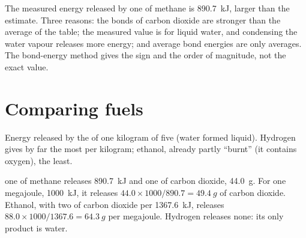 \begin{remark}\label{rem:g11:reaction-energy:compare}
The measured energy released by  one  of methane is
\qty{890.7}{kJ}, larger than the estimate. Three reasons: the 
bonds of carbon dioxide are stronger than the average  of the
table; the measured value is for liquid water, and condensing the water
vapour releases more energy; and average bond energies are only
averages. The bond-energy method gives the sign and the order of
magnitude, not the exact value.
\end{remark}

\section{Comparing fuels}

\begin{omfigure}

{\small Energy released by the  of one kilogram of
five  (water formed liquid). Hydrogen gives by far the most per
kilogram; ethanol, already partly ``burnt'' (it contains oxygen), the
least.}
\end{omfigure}

\begin{example}\label{ex:g11:reaction-energy:co2}
 one  of methane releases \qty{890.7}{kJ} and one  of
carbon dioxide, \qty{44.0}{g}. For one megajoule, \qty{1000}{kJ}, it
releases $44.0 \times 1000 / 890.7 = \qty{49.4}{g}$ of carbon dioxide.
Ethanol, with two  of carbon dioxide per \qty{1367.6}{kJ}, releases
$88.0 \times 1000 / 1367.6 = \qty{64.3}{g}$ per megajoule. Hydrogen
releases none: its only product is water.
\end{example}

